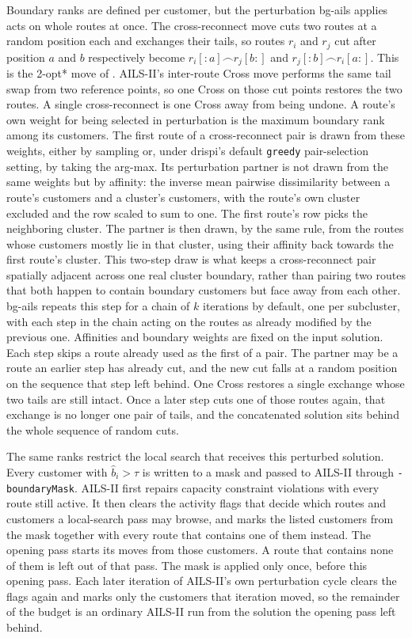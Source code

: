 Boundary ranks are defined per customer, but the perturbation \gls{bg-ails} applies acts on whole routes at once. The cross-reconnect move cuts two routes at a random position each and exchanges their tails, so routes $r_i$ and $r_j$ cut after position $a$ and $b$ respectively become $r_i[{:}a] \frown r_j[b{:}]$ and $r_j[{:}b] \frown r_i[a{:}]$. This is the 2-opt* move of \citet{potvinExchangeHeuristicRouting1995}. AILS-II's inter-route Cross move performs the same tail swap from two reference points, so one Cross on those cut points restores the two routes. A single cross-reconnect is one Cross away from being undone. A route's own weight for being selected in perturbation is the maximum boundary rank among its customers. The first route of a cross-reconnect pair is drawn from these weights, either by sampling or, under \gls{drispi}'s default \texttt{greedy} pair-selection setting, by taking the arg-max. Its perturbation partner is not drawn from the same weights but by affinity: the inverse mean pairwise dissimilarity between a route's customers and a cluster's customers, with the route's own cluster excluded and the row scaled to sum to one. The first route's row picks the neighboring cluster. The partner is then drawn, by the same rule, from the routes whose customers mostly lie in that cluster, using their affinity back towards the first route's cluster. This two-step draw is what keeps a cross-reconnect pair spatially adjacent across one real cluster boundary, rather than pairing two routes that both happen to contain boundary customers but face away from each other. \gls{bg-ails} repeats this step for a chain of $k$ iterations by default, one per subcluster, with each step in the chain acting on the routes as already modified by the previous one. Affinities and boundary weights are fixed on the input solution. Each step skips a route already used as the first of a pair. The partner may be a route an earlier step has already cut, and the new cut falls at a random position on the sequence that step left behind. One Cross restores a single exchange whose two tails are still intact. Once a later step cuts one of those routes again, that exchange is no longer one pair of tails, and the concatenated solution sits behind the whole sequence of random cuts.

The same ranks restrict the local search that receives this perturbed solution. Every customer with $\hat b_i > \tau$ is written to a mask and passed to AILS-II through \texttt{-boundaryMask}. AILS-II first repairs capacity constraint violations with every route still active. It then clears the activity flags that decide which routes and customers a local-search pass may browse, and marks the listed customers from the mask together with every route that contains one of them instead. The opening pass starts its moves from those customers. A route that contains none of them is left out of that pass. The mask is applied only once, before this opening pass. Each later iteration of AILS-II's own perturbation cycle clears the flags again and marks only the customers that iteration moved, so the remainder of the budget is an ordinary AILS-II run from the solution the opening pass left behind.

